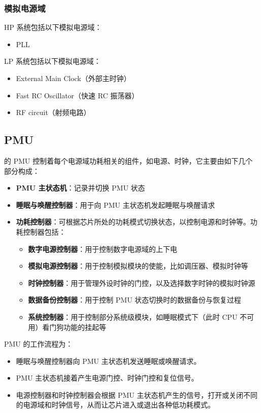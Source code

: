 \documentclass[main\_\_CN.tex]{subfiles}
\begin{document}
\subsubsection{模拟电源域}

HP 系统包括以下模拟电源域：

\begin{itemize}
    \item PLL
\end{itemize}

LP 系统包括以下模拟电源域：

\begin{itemize}
    \item External Main Clock（外部主时钟）
    \item Fast RC Oscillator（快速 RC 振荡器）
    \item RF circuit（射频电路）
\end{itemize}

\subsection{PMU}

\chipname{} 的 PMU 控制着每个电源域功耗相关的组件，如电源、时钟，它主要由如下几个部分构成：

\begin{itemize}
    \item \textbf{PMU 主状态机}：记录并切换 PMU 状态
    \item \textbf{睡眠与唤醒控制器}：用于向 PMU 主状态机发起睡眠与唤醒请求
    \item \textbf{功耗控制器}：可根据芯片所处的功耗模式切换状态，以控制电源和时钟等。功耗控制器包括：
        \begin{itemize}
            \item \textbf{数字电源控制器}：用于控制数字电源域的上下电
            \item \textbf{模拟电源控制器}：用于控制模拟模块的使能，比如调压器、模拟时钟等
            \item \textbf{时钟控制器}：用于管理外设时钟的门控，以及选择数字时钟的模拟时钟源
            \item \textbf{数据备份控制器}：用于控制 PMU 状态切换时的数据备份与恢复过程
            \item \textbf{系统控制器}：用于控制部分系统级模块，如睡眠模式下（此时 CPU 不可用）看门狗功能的挂起等
        \end{itemize}
\end{itemize}

PMU 的工作流程为：
\begin{itemize}
    \item 睡眠与唤醒控制器向 PMU 主状态机发送睡眠或唤醒请求。
    \item PMU 主状态机接着产生电源门控、时钟门控和复位信号。
    \item 电源控制器和时钟控制器会根据 PMU 主状态机产生的信号，打开或关闭不同的电源域和时钟信号，从而让芯片进入或退出各种低功耗模式。
\end{itemize}
\end{document}
